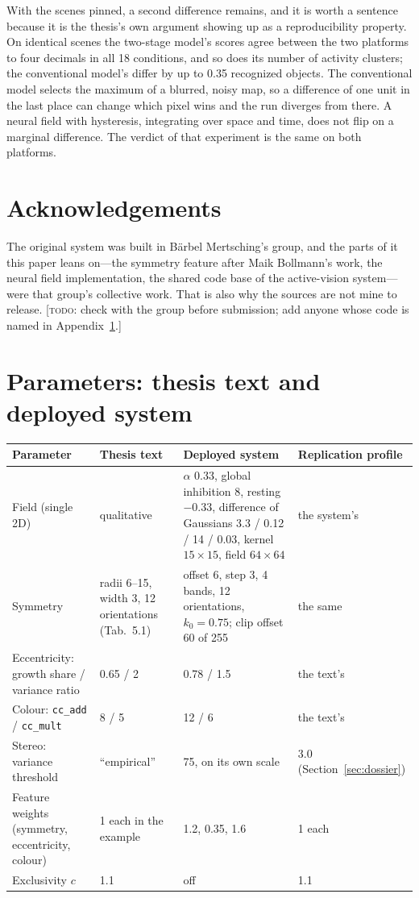 \documentclass[11pt,a4paper]{article}
\newcommand{\todo}[1]{\textcolor{red!70!black}{[\textsc{todo:} #1]}}
\newcommand{\todo}[1]{}
\begin{document}
With the scenes pinned, a second difference remains, and it is worth a sentence
because it is the thesis's own argument showing up as a reproducibility
property. On identical scenes the two-stage model's scores agree between the two
platforms to four decimals in all 18 conditions, and so does its number of
activity clusters; the conventional model's differ by up to 0.35 recognized
objects. The conventional model selects the maximum of a blurred, noisy map, so
a difference of one unit in the last place can change which pixel wins and the
run diverges from there. A neural field with hysteresis, integrating over space
and time, does not flip on a marginal difference. The verdict of that experiment
is the same on both platforms.

\section*{Acknowledgements}
The original system was built in B\"arbel Mertsching's group, and the parts of it
this paper leans on---the symmetry feature after Maik Bollmann's work, the neural
field implementation, the shared code base of the active-vision system---were
that group's collective work. That is also why the sources are not mine to
release. \todo{check with the group before submission; add anyone whose code is
named in Appendix~\ref{app:params}.}




\appendix
\section{Parameters: thesis text and deployed system}
\label{app:params}
\begin{table}[h]
\footnotesize
\begin{tabularx}{\linewidth}{@{}lXXl@{}}
\toprule
Parameter & Thesis text & Deployed system & Replication profile \\
\midrule
Field (single 2D) & qualitative & $\alpha$ 0.33, global inhibition 8, resting $-0.33$, difference of Gaussians 3.3 / 0.12 / 14 / 0.03, kernel $15\times15$, field $64\times64$ & the system's \\
Symmetry & radii 6--15, width 3, 12 orientations (Tab.~5.1) & offset 6, step 3, 4 bands, 12 orientations, $k_0 = 0.75$; clip offset 60 of 255 & the same \\
Eccentricity: growth share / variance ratio & 0.65 / 2 & 0.78 / 1.5 & the text's \\
Colour: \texttt{cc\_add} / \texttt{cc\_mult} & 8 / 5 & 12 / 6 & the text's \\
Stereo: variance threshold & ``empirical'' & 75, on its own scale & 3.0 (Section~\ref{sec:dossier}) \\
Feature weights (symmetry, eccentricity, colour) & 1 each in the example & 1.2, 0.35, 1.6 & 1 each \\
Exclusivity $c$ & 1.1 & off & 1.1 \\
\bottomrule
\end{tabularx}
\end{table}
\end{document}
